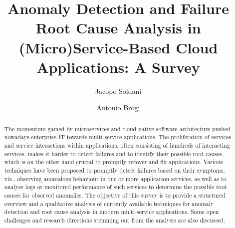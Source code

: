 \documentclass[acmsmall,nonacm]{acmart} %
\newcommand{\eg}{e.g.,\xspace}
\newcommand{\viz}{viz.,\xspace}
\begin{document}
\title{Anomaly Detection and Failure Root Cause Analysis in (Micro)Service-Based Cloud Applications: A Survey}

\renewcommand{\shorttitle}{Anomaly Detection and Failure Root Cause Analysis in (Micro)Service-Based Cloud Applications}

\author{Jacopo Soldani}
\author{Antonio Brogi}

\renewcommand{\shortauthors}{J. Soldani and A. Brogi}

\begin{abstract}
The momentum gained by microservices and cloud-native software architecture pushed nowadays enterprise IT towards multi-service applications.
The proliferation of services and service interactions within applications, 
often consisting of hundreds of interacting services, makes it harder to detect failures and to identify their
possible root causes, which is on the other hand crucial to promptly recover and fix applications. Various techniques
have been proposed to promptly detect failures based on their symptoms, viz., observing anomalous
behaviour in one or more application services, as well as to analyse logs or monitored performance of such
services to determine the possible root causes for observed anomalies. 
%
The objective of this survey is to provide a structured overview and a qualitative analysis of currently available techniques for anomaly detection and root cause analysis in modern multi-service applications.
Some open challenges and research directions stemming out from the analysis are also discussed.
\end{abstract}
\end{document}
